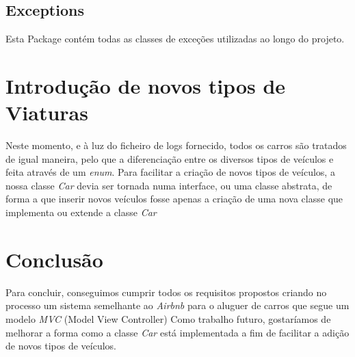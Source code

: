\documentclass[a4paper]{report}
\begin{document}
\section{Exceptions}

Esta Package contém todas as classes de exceções utilizadas ao longo do projeto.

\chapter{Introdução de novos tipos de Viaturas}

Neste momento, e à luz do ficheiro de logs fornecido, todos os carros são tratados de igual maneira,
pelo que a diferenciação entre os diversos tipos de veículos e feita através de um \textit{enum}.
Para facilitar a criação de novos tipos de veículos, a nossa classe \textit{Car} 
devia ser tornada numa interface, ou uma classe abstrata, de forma a que inserir novos veículos fosse
apenas a criação de uma nova classe que implementa ou extende a classe \textit{Car}

\chapter{Conclusão}

Para concluir, conseguimos cumprir todos os requisitos propostos criando no processo um
sistema semelhante ao \textit{Airbnb} para o aluguer de carros que segue um modelo \textit{MVC} (Model View Controller)
Como trabalho futuro, gostaríamos de melhorar a forma como a classe \textit{Car} está implementada a fim
de facilitar a adição de novos tipos de veículos. 
\end{document}
